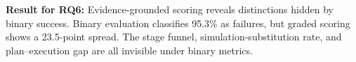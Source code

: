 \begin{mdframed}[linecolor=black,linewidth=1pt,backgroundcolor=gray!10,roundcorner=3pt,nobreak=true]
\noindent\textbf{Result for RQ6:} Evidence-grounded scoring reveals distinctions hidden by binary success. Binary evaluation classifies 95.3\% as failures, but graded scoring shows a 23.5-point spread. The stage funnel, simulation-substitution rate, and plan--execution gap are all invisible under binary metrics.
\end{mdframed}
